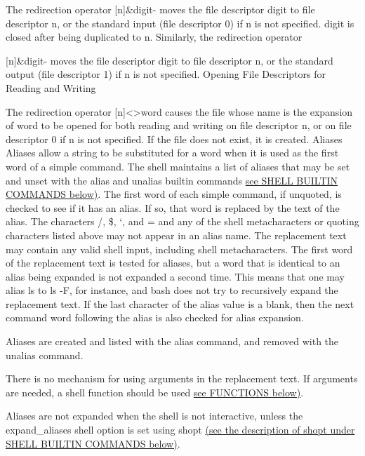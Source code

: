 The redirection operator
[n]\&digit-
moves the file descriptor digit to file descriptor n, or the standard input (file descriptor 0) if n is not specified. digit is closed after being duplicated to n.
Similarly, the redirection operator

[n]\&digit-
moves the file descriptor digit to file descriptor n, or the standard output (file descriptor 1) if n is not specified.
Opening File Descriptors for Reading and Writing

The redirection operator
[n]<>word
causes the file whose name is the expansion of word to be opened for both reading and writing on file descriptor n, or on file descriptor 0 if n is not specified. If the file does not exist, it is created.
Aliases
Aliases allow a string to be substituted for a word when it is used as the first word of a simple command. The shell maintains a list of aliases that may be set and unset with the alias and unalias builtin commands \hyperref[sec:shellbuiltincommands]{see SHELL BUILTIN COMMANDS below)}. The first word of each simple command, if unquoted, is checked to see if it has an alias. If so, that word is replaced by the text of the alias. The characters /, \$, `, and = and any of the shell metacharacters or quoting characters listed above may not appear in an alias name. The replacement text may contain any valid shell input, including shell metacharacters. The first word of the replacement text is tested for aliases, but a word that is identical to an alias being expanded is not expanded a second time. This means that one may alias ls to ls -F, for instance, and bash does not try to recursively expand the replacement text. If the last character of the alias value is a blank, then the next command word following the alias is also checked for alias expansion.

Aliases are created and listed with the alias command, and removed with the unalias command.

There is no mechanism for using arguments in the replacement text. If arguments are needed, a shell function should be used \hyperref[sec:functions]{see FUNCTIONS below)}.

Aliases are not expanded when the shell is not interactive, unless the expand\_aliases shell option is set using shopt \hyperref[sec:shellbuiltincommands]{(see the description of shopt under SHELL BUILTIN COMMANDS below)}.

